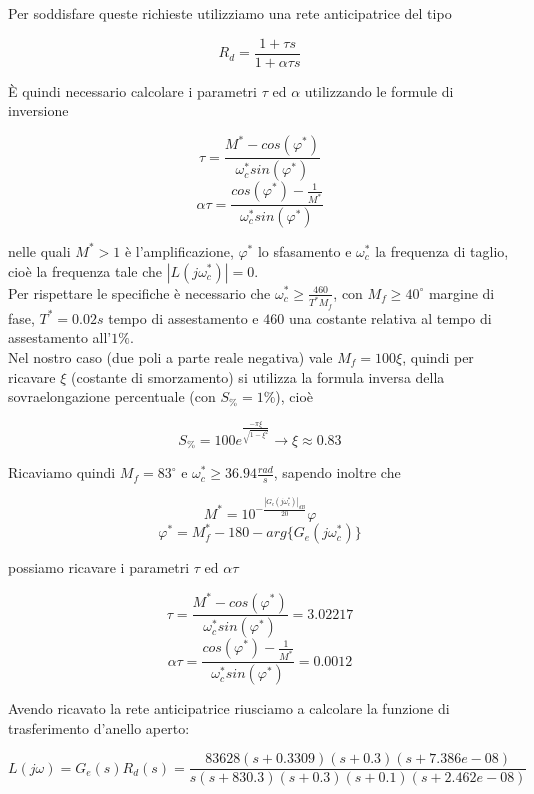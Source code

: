 \documentclass{article}
\begin{document}
\noindent
Per soddisfare queste richieste utilizziamo una rete anticipatrice del tipo
\begin{large}
\[
R_d=\frac{1+\tau s}{1 + \alpha\tau s}
\]
\end{large}

\noindent
È quindi necessario calcolare i parametri $\tau$ ed $\alpha$ utilizzando le formule di inversione
\begin{large}
\[
\tau=\frac{M^*-cos(\varphi^*)}{\omega_c^* sin(\varphi^*)}
\]
\[
\alpha\tau=\frac{cos(\varphi^*)-\frac{1}{M^*}}{\omega_c^* sin(\varphi^*)}
\]
\end{large}

\noindent
nelle quali $M^* > 1$ è l'amplificazione, $\varphi^*$ lo sfasamento e $\omega_c^*$ la frequenza di taglio, cioè la frequenza tale che $|L(j\omega_c^*)|=0$.\\Per rispettare le specifiche è necessario che $\omega_c^*\geq \frac{460}{T^*M_f}$, con $M_f\geq40^{\circ}$ margine di fase, $T^*=0.02 s$ tempo di assestamento e $460$ una costante relativa al tempo di assestamento all'$1\%$.\\
Nel nostro caso (due poli a parte reale negativa) vale $M_f=100\xi$, quindi per ricavare $\xi$ (costante di smorzamento) si utilizza la formula inversa della sovraelongazione percentuale (con $S_\%=1\%$), cioè 
\begin{large}
\[
S_\%=100 e^{\frac{-\pi\xi}{\sqrt{1-\xi^2}}} \longrightarrow \xi\approx 0.83
\]
\end{large}
Ricaviamo quindi $M_f=83^{\circ}$ e $\omega_c^*\geq 36.94 \frac{rad}{s}$, sapendo inoltre che
\begin{large}
\[
M^*=10^{-\frac{|G_e(j\omega_c^*)|_{dB}}{20}}
\varphi
\]
\[
\varphi^*=M_f^*-180-arg\{G_e(j\omega_c^*)\}
\]
\end{large}
possiamo ricavare i parametri $\tau$ ed $\alpha\tau$
\begin{large}
\[
\tau=\frac{M^*-cos(\varphi^*)}{\omega_c^* sin(\varphi^*)}=3.02217
\]
\[
\alpha\tau=\frac{cos(\varphi^*)-\frac{1}{M^*}}{\omega_c^* sin(\varphi^*)}=0.0012
\]
\end{large}
Avendo ricavato la rete anticipatrice riusciamo a calcolare la funzione di trasferimento d'anello aperto:
\begin{large}
\[
L(j\omega)=G_e(s)R_d(s)=\frac{83628 (s+0.3309) (s+0.3) (s+7.386e-08)}{s (s+830.3) (s+0.3) (s+0.1) (s+2.462e-08)}
\]
\end{large}
\end{document}
